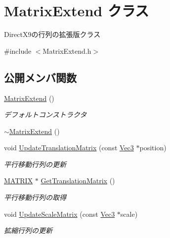 \hypertarget{class_matrix_extend}{}\section{Matrix\+Extend クラス}
\label{class_matrix_extend}


Direct\+X9の行列の拡張版クラス  




{\ttfamily \#include $<$Matrix\+Extend.\+h$>$}

\subsection*{公開メンバ関数}
\begin{DoxyCompactItemize}
\item 
\mbox{\hyperlink{class_matrix_extend_a0058bf9dcf42d7f0c53b6fb3559b6a6e}{Matrix\+Extend}} ()
\begin{DoxyCompactList}\small\item\em デフォルトコンストラクタ \end{DoxyCompactList}\item 
\mbox{\hyperlink{class_matrix_extend_ae1d80dfa20420bdc58e85eccc525fe91}{$\sim$\+Matrix\+Extend}} ()
\item 
void \mbox{\hyperlink{class_matrix_extend_a6ca471ad3fea88a84fde7623c84f52f6}{Update\+Translation\+Matrix}} (const \mbox{\hyperlink{_vector3_d_8h_ab16f59e4393f29a01ec8b9bbbabbe65d}{Vec3}} $\ast$position)
\begin{DoxyCompactList}\small\item\em 平行移動行列の更新 \end{DoxyCompactList}\item 
\mbox{\hyperlink{_vector3_d_8h_a032295cd9fb1b711757c90667278e744}{M\+A\+T\+R\+IX}} $\ast$ \mbox{\hyperlink{class_matrix_extend_a95b114379190ca0fee5d40394f9842f1}{Get\+Translation\+Matrix}} ()
\begin{DoxyCompactList}\small\item\em 平行移動行列の取得 \end{DoxyCompactList}\item 
void \mbox{\hyperlink{class_matrix_extend_afc536ab192cd6ef2b9a93861af5bf005}{Update\+Scale\+Matrix}} (const \mbox{\hyperlink{_vector3_d_8h_ab16f59e4393f29a01ec8b9bbbabbe65d}{Vec3}} $\ast$scale)
\begin{DoxyCompactList}\small\item\em 拡縮行列の更新 \end{DoxyCompactList}\item 

\end{DoxyCompactItemize}
